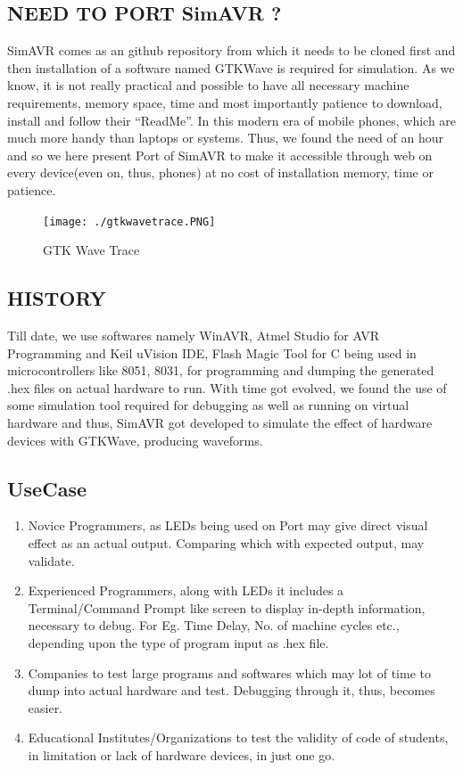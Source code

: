 \documentclass[12pt]{article}
\begin{document}
\subsection{NEED TO PORT SimAVR ?}
SimAVR comes as an github repository from which it needs to be cloned first and then installation of a software named GTKWave is required for simulation. As we know, it is not really practical and possible to have all necessary machine requirements, memory space, time and most importantly patience to download, install and follow their “ReadMe”. In this modern era of mobile phones, which are much more handy than laptops or systems. Thus, we found the need of an hour and so we here present Port of SimAVR to make it accessible through web on every device(even on, thus, phones) at no cost of installation memory, time or patience.

\begin{figure}[h]
 \centering
 \texttt{[image: ./gtkwavetrace.PNG]}
 \caption{GTK Wave Trace\label{fig:GTK Wave Trace}}
\end{figure}
\subsection{HISTORY}
Till date, we use softwares namely WinAVR, Atmel Studio for AVR Programming and Keil uVision IDE, Flash Magic Tool for C being used in microcontrollers like 8051, 8031, for programming and dumping the generated .hex files on actual hardware to run. With time got evolved, we found the use of some simulation tool required for debugging as well as running on virtual hardware and thus, SimAVR got developed to simulate the effect of hardware devices with GTKWave, producing waveforms.
\subsection{UseCase}
\begin{enumerate}
 \item Novice Programmers, as LEDs being used on Port may give direct visual effect as an actual output. Comparing which with expected output, may validate.
 \item Experienced Programmers, along with LEDs it includes a Terminal/Command Prompt like screen to display in-depth information, necessary to debug. For Eg. Time Delay, No. of machine cycles etc., depending upon the type of program input as .hex file.
 \item Companies to test large programs and softwares which may lot of time to dump into actual hardware and test. Debugging through it, thus, becomes easier.
 \item Educational Institutes/Organizations to test the validity of code of students, in limitation or lack of hardware devices, in just one go.
\end{enumerate}
\end{document}
